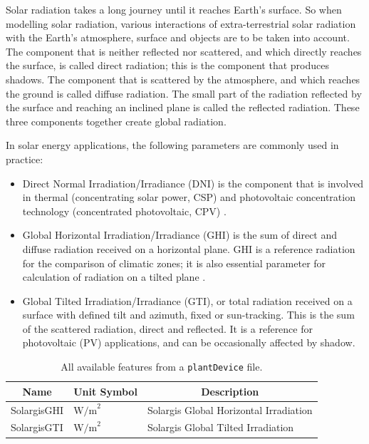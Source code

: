 Solar radiation takes a long journey until it reaches Earth’s surface. So when
modelling solar radiation, various interactions of extra-terrestrial solar
radiation with the Earth’s atmosphere, surface and objects are to be taken into
account\cite{solargis}. The component that is neither reflected nor scattered, and which
directly
reaches the surface, is called direct radiation; this is the component that
produces shadows. The component that is scattered by the atmosphere, and which
reaches the ground is called diffuse radiation. The small part of the radiation
reflected by the surface and reaching an inclined plane is called the reflected
radiation. These three components together create global radiation.

In solar energy applications, the following parameters are commonly used in
practice:

\begin{itemize}
	\item Direct Normal Irradiation/Irradiance (DNI) is the component that is
	      involved in thermal (concentrating solar power, CSP) and photovoltaic
	      concentration
	      technology (concentrated photovoltaic, CPV) \cite{solargis}.
	\item  Global Horizontal
	      Irradiation/Irradiance (GHI) is the sum of direct and diffuse radiation
	      received on a horizontal plane. GHI is a reference radiation for the
	      comparison of climatic zones; it is also essential parameter for
	      calculation of radiation on a tilted plane \cite{solargis}.
	\item Global Tilted Irradiation/Irradiance (GTI), or total
	      radiation received on a surface with defined tilt and azimuth, fixed or
	      sun-tracking. This is the sum of the scattered radiation, direct and
	      reflected. It is a reference for photovoltaic (PV) applications, and
	      can be occasionally affected by shadow\cite{solargis}.
\end{itemize}


\begin{table}[H]
	\begin{center}
		\begin{tabular}[c]{l|l|l}
			\multicolumn{1}{c|}{\textbf{Name}}        &
			\multicolumn{1}{c|}{\textbf{Unit Symbol}} &
			\multicolumn{1}{c}{\textbf{Description}}                                                            \\
			\hline
			SolargisGHI                               & $\text{W/m}^2$ & Solargis Global Horizontal Irradiation \\
			SolargisGTI                               & $\text{W/m}^2$ & Solargis Global Tilted Irradiation     \\
		\end{tabular}
		\caption{All available features from a \texttt{plantDevice} file.}\label{tab:solargisfeatures}
	\end{center}
\end{table}


